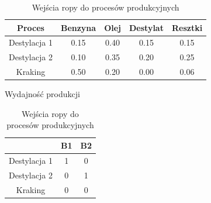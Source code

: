 \documentclass{article}
\begin{document}
\begin{table}[h]
    \centering
    \begin{minipage}{0.45\textwidth}
        \centering
        \begin{tabular}{c|cccc}
            Proces & Benzyna & Olej & Destylat & Resztki \\
            \hline
            Destylacja 1 & 0.15 & 0.40 & 0.15 & 0.15 \\
            Destylacja 2 & 0.10 & 0.35 & 0.20 & 0.25 \\
            Kraking & 0.50 & 0.20 & 0.00 & 0.06 \\
        \end{tabular}
        \caption{Wydajność produkcji}
        \label{tab:wydajnosc}
    \end{minipage}
    \hfill
    \begin{minipage}{0.45\textwidth}
        \centering
        \begin{tabular}{c|cc}
            & B1 & B2 \\
            \hline
            Destylacja 1 & 1 & 0 \\
            Destylacja 2 & 0 & 1 \\
            Kraking & 0 & 0 \\
        \end{tabular}
        \caption{Wejścia ropy do procesów produkcyjnych}
        \label{tab:wejscia_ropy}
    \end{minipage}
\end{table}
\end{document}
